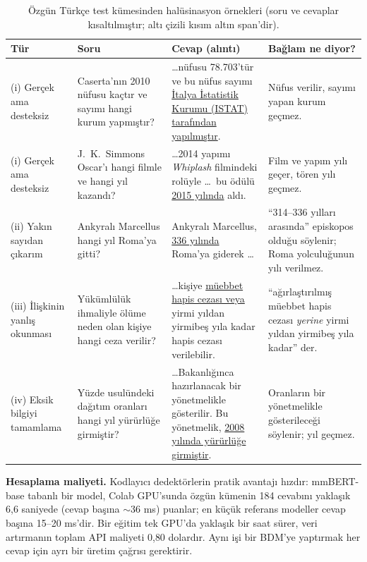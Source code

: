 \documentclass[conference,a4paper]{IEEEtran}
\begin{document}
\begin{table}[t]
\centering
\caption{Özgün Türkçe test kümesinden halüsinasyon örnekleri (soru ve cevaplar kısaltılmıştır; altı çizili kısım altın span'dir).}
\label{tab:examples}
\footnotesize
\setlength{\tabcolsep}{4pt}
\renewcommand{\arraystretch}{1.15}
\begin{tabular}{@{}>{\raggedright\arraybackslash}p{2.2cm}>{\raggedright\arraybackslash}p{3.9cm}>{\raggedright\arraybackslash}p{5.7cm}>{\raggedright\arraybackslash}p{5.0cm}@{}}
\toprule
Tür & Soru & Cevap (alıntı) & Bağlam ne diyor? \\
\midrule
(i) Gerçek ama desteksiz & Caserta'nın 2010 nüfusu kaçtır ve sayımı hangi kurum yapmıştır? & \ldots nüfusu 78.703'tür ve bu nüfus sayımı \uline{İtalya İstatistik Kurumu (ISTAT) tarafından yapılmıştır}. & Nüfus verilir, sayımı yapan kurum geçmez. \\
(i) Gerçek ama desteksiz & J.\ K.\ Simmons Oscar'ı hangi filmle ve hangi yıl kazandı? & \ldots 2014 yapımı \emph{Whiplash} filmindeki rolüyle \ldots\ bu ödülü \uline{2015 yılında} aldı. & Film ve yapım yılı geçer, tören yılı geçmez. \\
(ii) Yakın sayıdan çıkarım & Ankyralı Marcellus hangi yıl Roma'ya gitti? & Ankyralı Marcellus, \uline{336 yılında} Roma'ya giderek \ldots & ``314--336 yılları arasında'' episkopos olduğu söylenir; Roma yolculuğunun yılı verilmez. \\
(iii) İlişkinin yanlış okunması & Yükümlülük ihmaliyle ölüme neden olan kişiye hangi ceza verilir? & \ldots kişiye \uline{müebbet hapis cezası veya} yirmi yıldan yirmibeş yıla kadar hapis cezası verilebilir. & ``ağırlaştırılmış müebbet hapis cezası \emph{yerine} yirmi yıldan yirmibeş yıla kadar'' der. \\
(iv) Eksik bilgiyi tamamlama & Yüzde usulündeki dağıtım oranları hangi yıl yürürlüğe girmiştir? & \ldots Bakanlığınca hazırlanacak bir yönetmelikle gösterilir. Bu yönetmelik, \uline{2008 yılında yürürlüğe girmiştir}. & Oranların bir yönetmelikle gösterileceği söylenir; yıl geçmez. \\
\bottomrule
\end{tabular}
\end{table}

\textbf{Hesaplama maliyeti.} Kodlayıcı dedektörlerin pratik avantajı hızdır: mmBERT-base tabanlı bir model, Colab GPU'sunda özgün kümenin 184 cevabını yaklaşık 6{,}6 saniyede (cevap başına $\sim$36 ms) puanlar; en küçük referans modeller cevap başına 15--20 ms'dir. Bir eğitim tek GPU'da yaklaşık bir saat sürer, veri artırmanın toplam API maliyeti 0{,}80 dolardır. Aynı işi bir BDM'ye yaptırmak her cevap için ayrı bir üretim çağrısı gerektirir.
\end{document}
